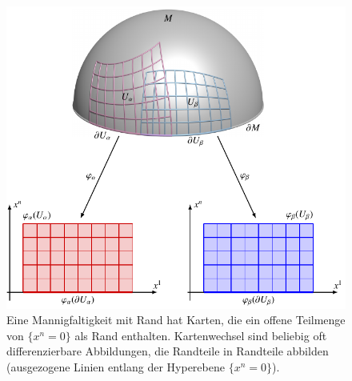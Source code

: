 %
%
%
\begin{figure}
\centering
\includegraphics{chapters/040-green/images/randkarten.pdf}
\caption{Eine Mannigfaltigkeit mit Rand hat Karten, die ein offene
Teilmenge von $\{x^n=0\}$ als Rand enthalten.
Kartenwechsel sind beliebig oft differenzierbare Abbildungen, die
Randteile in Randteile abbilden (ausgezogene Linien entlang der
Hyperebene $\{x^n=0\}$).
\label{buch:green:green:fig:randkarten}}
\end{figure}
